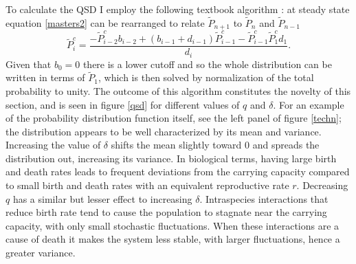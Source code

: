 To calculate the QSD I employ the following textbook algorithm \cite{Nisbet1982}: at steady state equation \ref{masters2} can be rearranged to relate $\tilde{P}_{n+1}$ to $\tilde{P}_n$ and $\tilde{P}_{n-1}$
\begin{equation}
\widetilde{P}^c_{i} = \frac{- \widetilde{P}^c_{i-2}b_{i-2} 
	+ (b_{i-1}+d_{i-1})\widetilde{P}^c_{i-1} 
	- \widetilde{P}^c_{i-1}\widetilde{P}^c_{1}d_{1}}{d_{i}}.
\end{equation}
Given that $b_0=0$ there is a lower cutoff and so the whole distribution can be written in terms of $\tilde{P}_1$, which is then solved by normalization of the total probability to unity. 
The outcome of this algorithm constitutes the novelty of this section, and is seen in figure \ref{qsd} for different values of $q$ and $\delta$. 
For an example of the probability distribution function itself, see the left panel of figure \ref{techn}; the distribution appears to be well characterized by its mean and variance. 
Increasing the value of $\delta$ shifts the mean slightly toward $0$ and spreads the distribution out, increasing its variance. 
In biological terms, having large birth and death rates leads to frequent deviations from the carrying capacity compared to small birth and death rates with an equivalent reproductive rate $r$. 
Decreasing $q$ has a similar but lesser effect to increasing $\delta$. %
Intraspecies interactions that reduce birth rate tend to cause the population to stagnate near the carrying capacity, with only small stochastic fluctuations. 
When these interactions are a cause of death it makes the system less stable, with larger fluctuations, hence a greater variance. 


